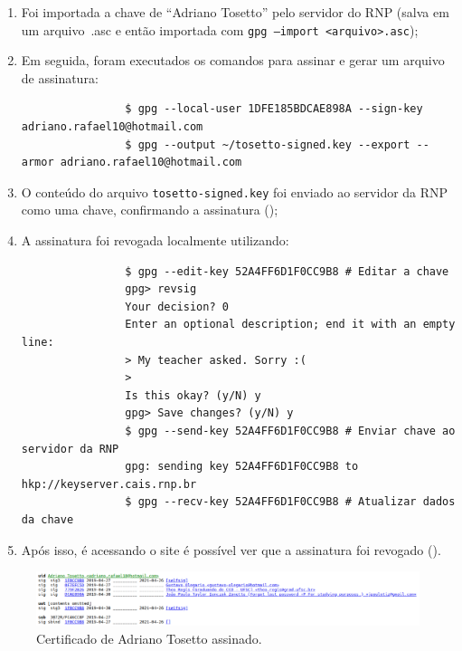 \documentclass{article}
\begin{document}
    \begin{enumerate}
        \item Foi importada a chave de ``Adriano Tosetto'' pelo servidor do RNP
            (salva em um arquivo~.asc e então importada com \texttt{gpg
            --import <arquivo>.asc});
        \item Em seguida, foram executados os comandos para assinar e gerar um
            arquivo de assinatura:

            \begin{verbatim}
                $ gpg --local-user 1DFE185BDCAE898A --sign-key adriano.rafael10@hotmail.com
                $ gpg --output ~/tosetto-signed.key --export --armor adriano.rafael10@hotmail.com
            \end{verbatim}

        \item O conteúdo do arquivo \texttt{tosetto-signed.key} foi enviado ao
            servidor da RNP como uma chave, confirmando a assinatura
            ();
        \item A assinatura foi revogada localmente utilizando:

            \begin{verbatim}
                $ gpg --edit-key 52A4FF6D1F0CC9B8 # Editar a chave
                gpg> revsig
                Your decision? 0
                Enter an optional description; end it with an empty line:
                > My teacher asked. Sorry :(
                >
                Is this okay? (y/N) y
                gpg> Save changes? (y/N) y
                $ gpg --send-key 52A4FF6D1F0CC9B8 # Enviar chave ao servidor da RNP
                gpg: sending key 52A4FF6D1F0CC9B8 to hkp://keyserver.cais.rnp.br
                $ gpg --recv-key 52A4FF6D1F0CC9B8 # Atualizar dados da chave
            \end{verbatim}
        \item Após isso, é acessando o site é possível ver que a assinatura foi
            revogado ().
    \end{enumerate}

    \begin{figure}[h]
        \centering
        \includegraphics[keepaspectratio,width=1\textwidth]{tosetto-signed}
        \caption{%
            Certificado de Adriano Tosetto assinado.\label{fig:revokee-sign}
        }
    \end{figure}
\end{document}
